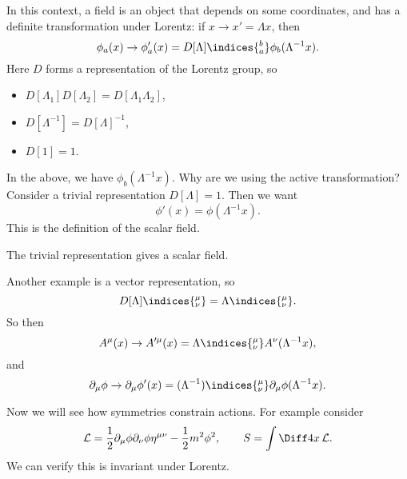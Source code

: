 \documentclass[12pt]{article}
\begin{document}
In this context, a field is an object that depends on some coordinates, and has a definite transformation under Lorentz: if $x \to x' = \Lambda x$, then
\[
	\phi_a(x) \to \phi_a'(x) = D[\Lambda]\indices{_{a}^b} \phi_b(\Lambda^{-1}x).
\]
Here $D$ forms a representation of the Lorentz group, so
\begin{itemize}
	\item $D[\Lambda_1] D[\Lambda_2] = D[\Lambda_1 \Lambda_2]$,
	\item $D[\Lambda^{-1}] = D[\Lambda]^{-1}$,
	\item $D[1] = 1$.
\end{itemize}

In the above, we have $\phi_b(\Lambda^{-1}x)$. Why are we using the active transformation? Consider a trivial representation $D[\Lambda] = 1$. Then we want
\[
\phi'(x) = \phi(\Lambda^{-1} x).
\]
This is the definition of the scalar field.

\begin{center}
\end{center}

\begin{exbox}
	The trivial representation gives a scalar field.

	Another example is a vector representation, so
	\[
		D[\Lambda] \indices{^{\mu}_{\nu}} = \Lambda\indices{^{\mu}_{\nu}}.
	\]
	So then
	\[
	A^\mu(x) \to A'^\mu(x) = \Lambda\indices{^{\mu}_{\nu}} A^\nu(\Lambda^{-1}x),
	\]
	and
	\[
	\partial_\mu \phi \to \partial_\mu \phi'(x) = (\Lambda^{-1})\indices{^{\mu}_{\nu}} \partial_\mu \phi(\Lambda^{-1}x).
	\]
\end{exbox}

Now we will see how symmetries constrain actions. For example consider
\[
\mathcal{L} = \frac{1}{2} \partial_\mu \phi \partial_\nu \phi \eta^{\mu\nu} - \frac{1}{2} m^2 \phi^2, \qquad S = \int \Diff 4 x \, \mathcal{L}.
\]
We can verify this is invariant under Lorentz.
\end{document}
